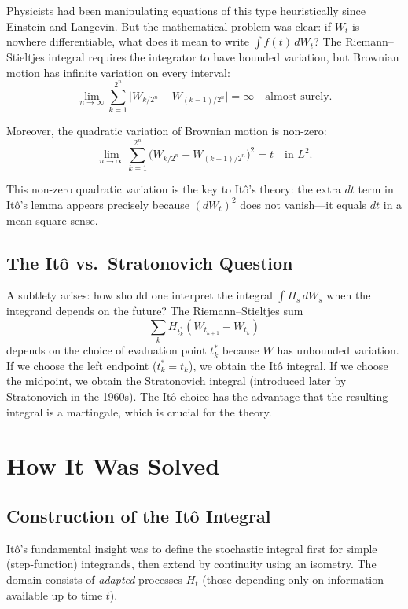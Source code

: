 Physicists had been manipulating equations of this type heuristically since Einstein and Langevin. But the mathematical problem was clear: if \(W_t\) is nowhere differentiable, what does it mean to write \(\int f(t)\,dW_t\)? The Riemann--Stieltjes integral requires the integrator to have bounded variation, but Brownian motion has infinite variation on every interval:
\[
\lim_{n \to \infty} \sum_{k=1}^{2^n} \bigl|W_{k/2^n} - W_{(k-1)/2^n}\bigr| = \infty \quad \text{almost surely}.
\]

Moreover, the quadratic variation of Brownian motion is non-zero:
\[
\lim_{n \to \infty} \sum_{k=1}^{2^n} \bigl(W_{k/2^n} - W_{(k-1)/2^n}\bigr)^2 = t \quad \text{in } L^2.
\]

This non-zero quadratic variation is the key to It\^{o}'s theory: the extra \(dt\) term in It\^{o}'s lemma appears precisely because \((dW_t)^2\) does not vanish---it equals \(dt\) in a mean-square sense.

\subsection{The It\^{o} vs.\ Stratonovich Question}

A subtlety arises: how should one interpret the integral \(\int H_s \, dW_s\) when the integrand depends on the future? The Riemann--Stieltjes sum
\[
\sum_{k} H_{t_k^*} (W_{t_{k+1}} - W_{t_k})
\]
depends on the choice of evaluation point \(t_k^*\) because \(W\) has unbounded variation. If we choose the left endpoint (\(t_k^* = t_k\)), we obtain the It\^{o} integral. If we choose the midpoint, we obtain the Stratonovich integral (introduced later by Stratonovich in the 1960s). The It\^{o} choice has the advantage that the resulting integral is a martingale, which is crucial for the theory.

\section{How It Was Solved}

\subsection{Construction of the It\^{o} Integral}

It\^{o}'s fundamental insight was to define the stochastic integral first for simple (step-function) integrands, then extend by continuity using an isometry. The domain consists of \emph{adapted} processes \(H_t\) (those depending only on information available up to time \(t\)).

